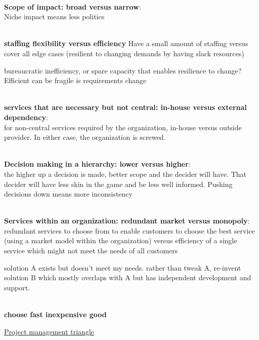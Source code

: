 \ \\

\textbf{Scope of impact: broad versus narrow}:\\
Niche impact means less politics

\ \\

\textbf{staffing flexibility versus efficiency}
Have a small amount of staffing versus cover all edge cases (resilient to changing demands by having slack resources)

bureaucratic inefficiency, or spare capacity that enables resilience to change?
Efficient can be fragile is requirements change


\ \\

\textbf{services that are necessary but not central: in-house versus external dependency}:\\
for non-central services required by the organization, in-house versus outside provider. In either case, the organization is screwed.

\ \\

\textbf{Decision making in a hierarchy: lower versus higher}:\\
the higher up a decision is made, better scope and the decider will have. That decider will have less skin in the game and be less well informed. Pushing decisions down means more inconsistency

\ \\

\textbf{Services within an organization: redundant market versus monopoly}: \\
redundant services to choose from to enable customers to choose the best service (using a market model within the organization) versus efficiency of a single service which might not meet the needs of all customers

solution A exists but doesn't meet my needs. 
rather than tweak A, re-invent solution B which mostly overlaps with A but has independent development and support. 


\ \\

\textbf{choose fast inexpensive good}

\href{https://en.wikipedia.org/wiki/Project_management_triangle}{Project management triangle}